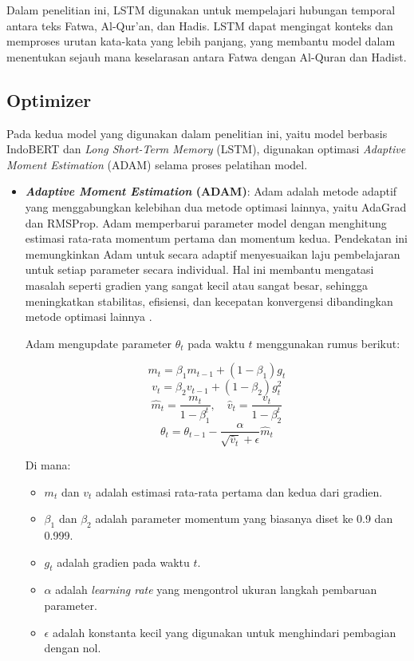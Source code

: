 \documentclass[12pt,a4paper]{article}
\begin{document}
\begin{itemize}
    Dalam penelitian ini, LSTM digunakan untuk mempelajari hubungan temporal antara teks Fatwa, Al-Qur'an, dan Hadis. LSTM dapat mengingat konteks dan memproses urutan kata-kata yang lebih panjang, yang membantu model dalam menentukan sejauh mana keselarasan antara Fatwa dengan Al-Quran dan Hadist.

\end{itemize}

\subsection{Optimizer}

Pada kedua model yang digunakan dalam penelitian ini, yaitu model berbasis IndoBERT dan \textit{Long Short-Term Memory} (LSTM), digunakan optimasi \textit{Adaptive Moment Estimation} (ADAM) selama proses pelatihan model.

\begin{itemize}
    \item \textbf{\textit{Adaptive Moment Estimation} (ADAM)}: Adam adalah metode adaptif yang menggabungkan kelebihan dua metode optimasi lainnya, yaitu AdaGrad dan RMSProp. Adam memperbarui parameter model dengan menghitung estimasi rata-rata momentum pertama dan momentum kedua. Pendekatan ini memungkinkan Adam untuk secara adaptif menyesuaikan laju pembelajaran untuk setiap parameter secara individual. Hal ini membantu mengatasi masalah seperti gradien yang sangat kecil atau sangat besar, sehingga meningkatkan stabilitas, efisiensi, dan kecepatan konvergensi dibandingkan metode optimasi lainnya \cite{Kingma}.
    
    Adam mengupdate parameter $\theta_t$ pada waktu $t$ menggunakan rumus berikut:
    
    \[
    m_t = \beta_1 m_{t-1} + (1 - \beta_1) g_t
    \]
    \[
    v_t = \beta_2 v_{t-1} + (1 - \beta_2) g_t^2
    \]
    \[
    \hat{m}_t = \frac{m_t}{1 - \beta_1^t}, \quad \hat{v}_t = \frac{v_t}{1 - \beta_2^t}
    \]
    \[
    \theta_t = \theta_{t-1} - \frac{\alpha}{\sqrt{\hat{v}_t} + \epsilon} \hat{m}_t
    \]
    
    Di mana:
    \begin{itemize}
        \item $m_t$ dan $v_t$ adalah estimasi rata-rata pertama dan kedua dari gradien.
        \item $\beta_1$ dan $\beta_2$ adalah parameter momentum yang biasanya diset ke 0.9 dan 0.999.
        \item $g_t$ adalah gradien pada waktu $t$.
        \item $\alpha$ adalah \textit{learning rate} yang mengontrol ukuran langkah pembaruan parameter.
        \item $\epsilon$ adalah konstanta kecil yang digunakan untuk menghindari pembagian dengan nol.
    \end{itemize}
\end{itemize}
\end{document}
